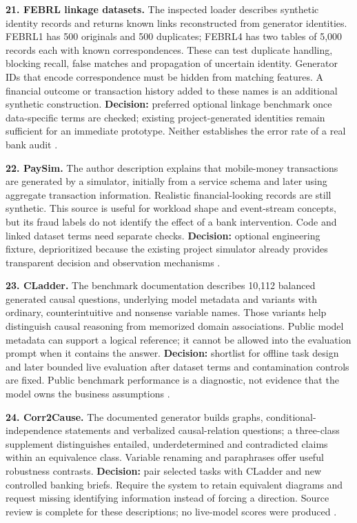\textbf{21. FEBRL linkage datasets.} The inspected loader describes
synthetic identity records and returns known links reconstructed from
generator identities. FEBRL1 has 500 originals and 500 duplicates;
FEBRL4 has two tables of 5,000 records each with known correspondences.
These can test duplicate handling, blocking recall, false matches and
propagation of uncertain identity. Generator IDs that encode
correspondence must be hidden from matching features. A financial
outcome or transaction history added to these names is an additional
synthetic construction. \textbf{Decision:} preferred optional linkage
benchmark once data-specific terms are checked; existing
project-generated identities remain sufficient for an immediate
prototype. Neither establishes the error rate of a real bank audit
\citep{pd15_febrl_source}.

\textbf{22. PaySim.} The author description explains that mobile-money
transactions are generated by a simulator, initially from a service
schema and later using aggregate transaction information. Realistic
financial-looking records are still synthetic. This source is useful for
workload shape and event-stream concepts, but its fraud labels do not
identify the effect of a bank intervention. Code and linked dataset
terms need separate checks. \textbf{Decision:} optional engineering
fixture, deprioritized because the existing project simulator already
provides transparent decision and observation mechanisms
\citep{pd15_paysim_pinned}.

\textbf{23. CLadder.} The benchmark documentation describes 10,112
balanced generated causal questions, underlying model metadata and
variants with ordinary, counterintuitive and nonsense variable names.
Those variants help distinguish causal reasoning from memorized domain
associations. Public model metadata can support a logical reference; it
cannot be allowed into the evaluation prompt when it contains the
answer. \textbf{Decision:} shortlist for offline task design and later
bounded live evaluation after dataset terms and contamination controls
are fixed. Public benchmark performance is a diagnostic, not evidence
that the model owns the business assumptions
\citep{pd15_cladder_pinned}.

\textbf{24. Corr2Cause.} The documented generator builds graphs,
conditional-independence statements and verbalized causal-relation
questions; a three-class supplement distinguishes entailed,
underdetermined and contradicted claims within an equivalence class.
Variable renaming and paraphrases offer useful robustness contrasts.
\textbf{Decision:} pair selected tasks with CLadder and new controlled
banking briefs. Require the system to retain equivalent diagrams and
request missing identifying information instead of forcing a direction.
Source review is complete for these descriptions; no live-model scores
were produced \citep{pd15_corr2cause_pinned}.

